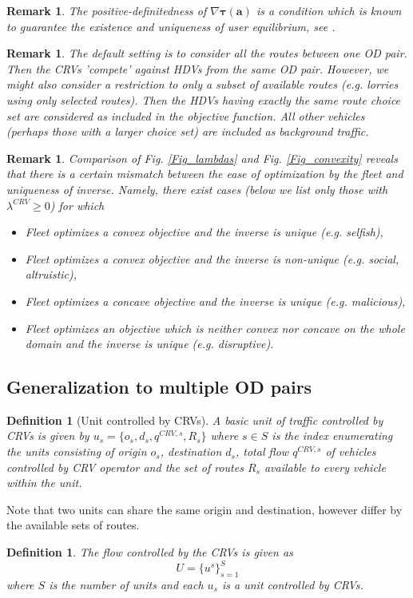 \documentclass[a4paper,11pt]{article}
\newtheorem{definition}[theorem]{Definition}
\newtheorem{remark}[theorem]{Remark}
\begin{document}
\begin{remark}
The positive-definitedness of $\nabla \boldsymbol{\tau(a)}$ is a condition which is known to guarantee the existence and uniqueness of user equilibrium, see \cite{Smith1979, Dafermos, WatlingAsymmetric}. 
\end{remark}

\begin{remark}
The default setting is to consider all the routes between one OD pair. Then the CRVs 'compete' against HDVs from the same OD pair. However, we might also consider a restriction to only a subset of available routes (e.g. lorries using only selected routes). Then the HDVs having \emph{exactly the same} route choice set are considered as included in the objective function. All other vehicles (perhaps those with a larger choice set) are included as background traffic. 
\end{remark}

\begin{remark}
\label{Rem_mismatch}
Comparison of Fig. \ref{Fig_lambdas} and Fig.  \ref{Fig_convexity} reveals that there is a certain mismatch between the ease of optimization by the fleet and uniqueness of inverse. Namely, there exist cases (below we list only those with $\lambda^{CRV} \ge 0$) for which
\begin{itemize}
\item Fleet optimizes a convex objective and the inverse is unique (e.g. selfish),
\item Fleet optimizes a convex objective and the inverse is non-unique (e.g. social, altruistic),
\item Fleet optimizes a concave objective and the inverse is unique (e.g. malicious),
\item Fleet optimizes an objective which is neither convex nor concave on the whole domain and the inverse is unique (e.g. disruptive).
\end{itemize}
\end{remark}

\subsection{Generalization to multiple OD pairs}
\label{Sec_Gen}

\begin{definition}[Unit controlled by CRVs]
A basic \emph{unit of traffic controlled by CRVs} is given by $u_s = \{o_s, d_s, q^{CRV,s}, R_s\}$ where $s \in S$ is the index enumerating the units consisting of origin $o_s$, destination $d_s$, total flow $q^{CRV,s}$ of vehicles controlled by CRV operator and the set of routes $R_s$ available to every vehicle within the unit. 
\end{definition}
Note that two units can share the same origin and destination, however differ by the available sets of routes. 
\begin{definition} 
The flow controlled by the CRVs is given as 
$$U = \{u^s\}_{s=1}^{S}$$ where $S$ is the number of units and each $u_s$ is a unit controlled by CRVs.  
\end{definition}
\end{document}
